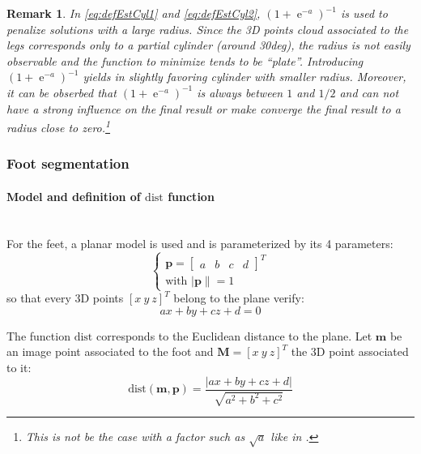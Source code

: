 \documentclass[letterpaper, 10 pt, conference]{ieeeconf}
\newtheorem{rem}{Remark}
\DeclareMathOperator{\e}{e}
\begin{document}
\begin{rem}
In \eqref{eq:defEstCyl1} and \eqref{eq:defEstCyl2}, $(1+\e^{-a})^{-1}$ is used to penalize solutions with a large radius. Since the 3D points cloud associated to the legs corresponds only to a partial cylinder (around 30deg), the radius is not easily observable and the function to minimize tends to be ``plate''. Introducing $(1+\e^{-a})^{-1}$ yields in slightly favoring cylinder with smaller radius. Moreover, it can be obserbed that $(1+\e^{-a})^{-1}$ is always between $1$ and $1/2$ and can not have a strong influence on the final result or make converge the final result to a radius close to zero.\footnote{This is not be the case with a factor such as $\sqrt{a}$ like in \cite{Leonardis97}.}
\end{rem}
\subsubsection{Foot segmentation}
\label{subsub:footSegmentation}
\paragraph{Model and definition of $\mathrm{dist}$ function}~\\
For the feet, a planar model is used and is parameterized by its 4 parameters:
\begin{equation}
	\left\{
	\begin{array}{l}
		\mathbf{p} = 
		\begin{bmatrix}
			a & b & c & d
		\end{bmatrix}^T\\
	\mbox{with } |\mathbf{p}\| = 1 
	\end{array}
	\right.
\end{equation}
so that every 3D points $[x\ y\ z]^T$ belong to the plane verify:
\begin{equation}
	ax+by+cz+d=0
\end{equation}

The function $\mathrm{dist}$ corresponds to the Euclidean distance to the plane. Let $\mathbf{m}$ be an image point associated to the foot and $\mathbf{M} = [x\ y \ z]^T$ the 3D point associated to it:
\begin{equation}
	\mathrm{dist}(\mathbf{m},\mathbf{p}) = 
	\frac{|ax+by+cz+d|}
	{\sqrt{a^2+b^2+c^2}}
\end{equation}
\end{document}
